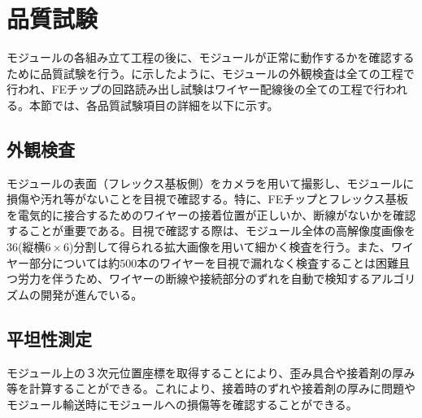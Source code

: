 \section{品質試験}
\label{sec:QCtest}

モジュールの各組み立て工程の後に、モジュールが正常に動作するかを確認するために品質試験を行う。に示したように、モジュールの外観検査は全ての工程で行われ、FEチップの回路読み出し試験はワイヤー配線後の全ての工程で行われる。本節では、各品質試験項目の詳細を以下に示す。



\subsection{外観検査}
\label{sec:visualinsp}
モジュールの表面（フレックス基板側）をカメラを用いて撮影し、モジュールに損傷や汚れ等がないことを目視で確認する。特に、FEチップとフレックス基板を電気的に接合するためのワイヤーの接着位置が正しいか、断線がないかを確認することが重要である。目視で確認する際は、モジュール全体の高解像度画像を36(縦横$6\times6$)分割して得られる拡大画像を用いて細かく検査を行う。また、ワイヤー部分については約$500$本のワイヤーを目視で漏れなく検査することは困難且つ労力を伴うため、ワイヤーの断線や接続部分のずれを自動で検知するアルゴリズムの開発が進んでいる。



\subsection{平坦性測定}
\label{sec:metrology}
モジュール上の３次元位置座標を取得することにより、歪み具合や接着剤の厚み等を計算することができる。これにより、接着時のずれや接着剤の厚みに問題やモジュール輸送時にモジュールへの損傷等を確認することができる。

